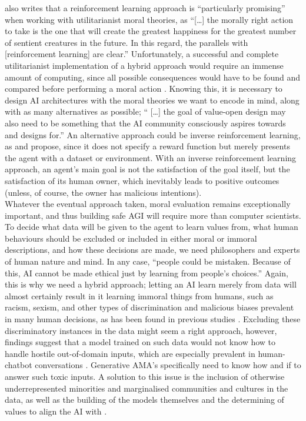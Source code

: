 \documentclass[final]{clv3} %
\begin{document}
\citet{gabriel} also writes that a reinforcement learning approach is “particularly promising” when working with utilitarianist moral theories, as “[…] the morally right action to take is the one that will create the greatest happiness for the greatest number of sentient creatures in the future. In this regard, the parallels with [reinforcement learning] are clear.” Unfortunately, a successful and complete utilitarianist implementation of a hybrid approach would require an immense amount of computing, since all possible consequences would have to be found and compared before performing a moral action \cite{allen2005}. Knowing this, it is necessary to design AI architectures with the moral theories we want to encode in mind, along with as many alternatives as possible; “ […] the goal of value-open design may also need to be something that the AI community consciously aspires towards and designs for.” \cite{gabriel} An alternative approach could be inverse reinforcement learning, as \citet{gabriel} and \citet{tegmark} propose, since it does not specify a reward function but merely presents the agent with a dataset or environment. With an inverse reinforcement learning approach, an agent’s main goal is not the satisfaction of the goal itself, but the satisfaction of its human owner, which inevitably leads to positive outcomes (unless, of course, the owner has malicious intentions). \\

Whatever the eventual approach taken, moral evaluation remains exceptionally important, and thus building safe AGI will require more than computer scientists. To decide what data will be given to the agent to learn values from, what human behaviours should be excluded or included in either moral or immoral descriptions, and how these decisions are made, we need philosophers and experts of human nature and mind. In any case, “people could be mistaken. Because of this, AI cannot be made ethical just by learning from people’s choices.” \cite{gabriel} Again, this is why we need a hybrid approach; letting an AI learn merely from data will almost certainly result in it learning immoral things from humans, such as racism, sexism, and other types of discrimination and malicious biases prevalent in many human decisions, as has been found in previous studies \citet{schramowski}. Excluding these discriminatory instances in the data might seem a right approach, however, findings suggest that a model trained on such data would not know how to handle hostile out-of-domain inputs, which are especially prevalent in human-chatbot conversations \cite{xu}. Generative AMA’s specifically need to know how and if to answer such toxic inputs. A solution to this issue is the inclusion of otherwise underrepresented minorities and marginalised communities and cultures in the data, as well as the building of the models themselves and the determining of values to align the AI with \cite{gabriel}.\\
\end{document}
